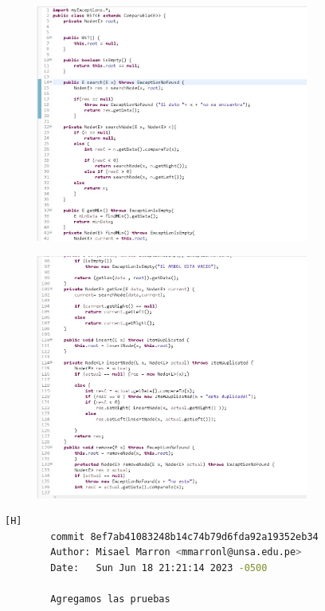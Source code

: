 \documentclass{article}
\begin{document}
	\begin{figure}[H]
		\centering
		\includegraphics[width=0.8\textwidth,keepaspectratio]{img/codigo2.jpg}	
	\end{figure}
	
	\begin{figure}[H]
		\centering
		\includegraphics[width=0.8\textwidth,keepaspectratio]{img/codigo2b.jpg}	
	\end{figure}
	\clearpage
	\begin{lstlisting}[language=bash,caption={Mi tercer commit es cuando termine y agregue la ejecucion.}][H]
		commit 8ef7ab41083248b14c74b79d6fda92a19352eb34 
		Author: Misael Marron <mmarronl@unsa.edu.pe>
		Date:   Sun Jun 18 21:21:14 2023 -0500

    	Agregamos las pruebas
	\end{lstlisting}
\end{document}
